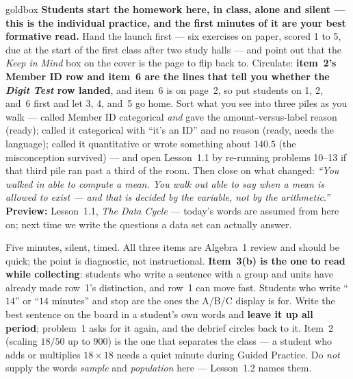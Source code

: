 \documentclass[10pt]{article}
\begin{document}
\boxguard
\begin{skillbox}{goldbox}
\textbf{Students start the homework here, in class, alone and silent --- this is the individual
practice, and the first minutes of it are your best formative read.} Hand the launch first ---
six exercises on paper, scored 1 to 5, due at the start of the first class after two study
halls --- and point out that the \emph{Keep in Mind} box on the cover is the page to flip back
to. Circulate: \textbf{item~2's Member ID row and item~6 are the lines that tell you whether
the \emph{Digit Test} row landed}, and item~6 is on page~2, so put students on 1, 2, and~6
first and let 3, 4, and~5 go home. Sort what you see into three piles as you walk --- called
Member ID categorical \emph{and} gave the amount-versus-label reason (ready); called it
categorical with ``it's an ID'' and no reason (ready, needs the language); called it
quantitative or wrote something about $140.5$ (the misconception survived) --- and open
Lesson~1.1 by re-running problems 10--13 if that third pile ran past a third of the room. Then
close on what changed: \emph{``You walked in able to compute a mean. You walk out able to say
when a mean is allowed to exist --- and that is decided by the variable, not by the
arithmetic.''} \textbf{Preview:} Lesson~1.1, \emph{The Data Cycle} --- today's words are
assumed from here on; next time we write the questions a data set can actually answer.
\end{skillbox}

\begin{teachernote}[Warm-Up]
Five minutes, silent, timed. All three items are Algebra~1 review and should be quick; the
point is diagnostic, not instructional. \textbf{Item~3(b) is the one to read while
collecting}: students who write a sentence with a group and units have already made row~1's
distinction, and row~1 can move fast. Students who write ``$14$'' or ``$14$ minutes'' and
stop are the ones the A/B/C display is for. Write the best sentence on the board in a
student's own words and \textbf{leave it up all period}; problem~1 asks for it again, and the
debrief circles back to it. Item~2 (scaling $18/50$ up to $900$) is the one that separates
the class --- a student who adds or multiplies $18 \times 18$ needs a quiet minute during
Guided Practice. Do \emph{not} supply the words \emph{sample} and \emph{population} here ---
Lesson~1.2 names them.
\end{teachernote}
\end{document}
